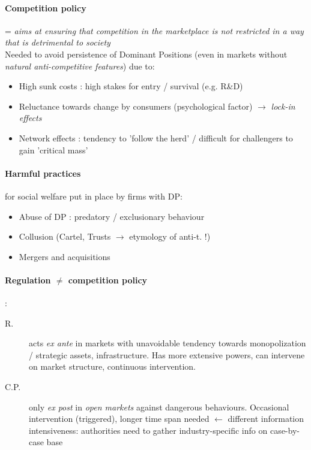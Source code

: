 \documentclass[10pt]{article}
\begin{document}
\paragraph{Competition policy} = \textit{aims at
ensuring that competition in the marketplace
is not restricted in a way that is detrimental to
society}
\\Needed to avoid persistence of Dominant Positions (even in markets without \textit{natural anti-competitive features}) due to:
\begin{itemize}
    \item High sunk costs : high stakes for entry / survival (e.g. R\&D)
    \item Reluctance towards change by consumers (psychological factor) $\rightarrow$ \textit{lock-in effects}
    \item Network effects : tendency to 'follow the herd' / difficult for challengers to gain 'critical mass'
\end{itemize}

\paragraph{Harmful practices} for social welfare put in place by firms with DP:
\begin{itemize}
    \item Abuse of DP : predatory / exclusionary behaviour
    \item Collusion (Cartel, Trusts $\rightarrow$ etymology of anti-t. !)
    \item Mergers and acquisitions    
\end{itemize}

\paragraph{Regulation $\neq$ competition policy} : 
\begin{description}
    \item[R.] acts \textit{ex ante} in markets with unavoidable tendency towards monopolization / strategic assets, infrastructure. Has more extensive powers, can intervene on market structure, continuous intervention.
    \item[C.P.] only \textit{ex post} in \textit{open markets} against dangerous behaviours. Occasional intervention (triggered), longer time span needed $\leftarrow$ different information intensiveness: authorities need to gather industry-specific info on case-by-case base
\end{description}  
\end{document}
